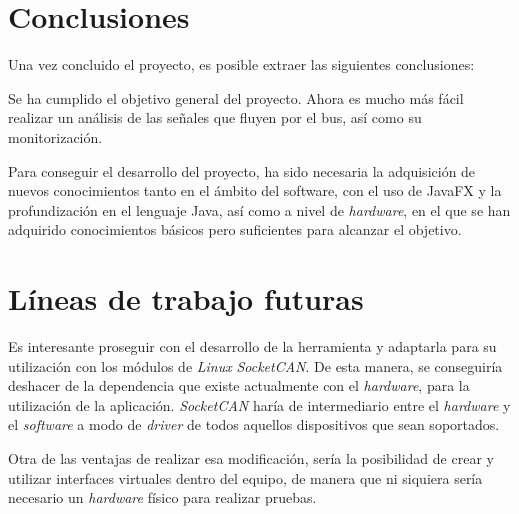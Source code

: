 
\section{Conclusiones}\label{conclusiones}

Una vez concluido el proyecto, es posible extraer las siguientes conclusiones:

Se ha cumplido el objetivo general del proyecto. Ahora es mucho más fácil realizar un análisis de las señales que fluyen por el bus, así como su monitorización.

Para conseguir el desarrollo del proyecto, ha sido necesaria la adquisición de nuevos conocimientos tanto en el ámbito del software, con el uso de JavaFX y la profundización en el lenguaje Java, así como a nivel de \emph{hardware}, en el que se han adquirido conocimientos básicos pero suficientes para alcanzar el objetivo.



\section{Líneas de trabajo futuras}\label{lineas_de_trabajo_futuras}

Es interesante proseguir con el desarrollo de la herramienta y adaptarla para su utilización con los módulos de \emph{Linux} \emph{SocketCAN}.
De esta manera, se conseguiría deshacer de la dependencia que existe actualmente con el \emph{hardware}, para la utilización de la aplicación. \emph{SocketCAN} haría de intermediario entre el \emph{hardware} y el \emph{software} a modo de \emph{driver} de todos aquellos dispositivos que sean soportados.

Otra de las ventajas de realizar esa modificación, sería la posibilidad de crear y utilizar interfaces virtuales dentro del equipo, de manera que ni siquiera sería necesario un \emph{hardware} físico para realizar pruebas.
